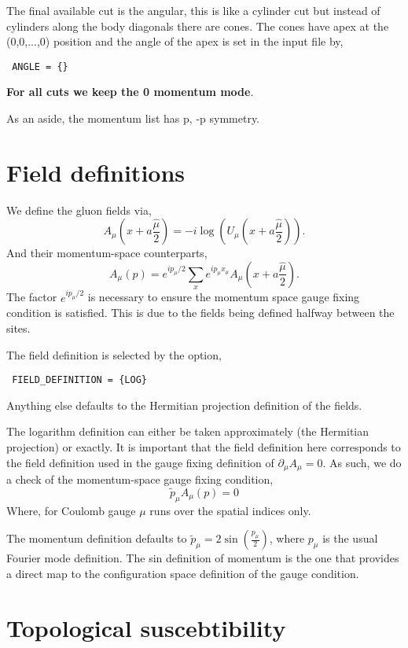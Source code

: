 \documentclass[12pt]{article}
\newcommand{\UMP}{\mbox{$U_\mu\left(x+a\frac{\hat\mu}{2}\right)$}}
\newcommand{\AMP}{\mbox{$A_\mu\left(x+a\frac{\hat\mu}{2}\right)$}}
\begin{document}
The final available cut is the angular, this is like a cylinder cut but instead of cylinders along the body diagonals there are cones. The cones have apex at the (0,0,...,0) position and the angle of the apex is set in the input file by,
\begin{verbatim}
 ANGLE = {}
\end{verbatim}

\textbf{For all cuts we keep the 0 momentum mode}. 

As an aside, the momentum list has p, -p symmetry.

\section{Field definitions}

We define the gluon fields via,
\begin{equation}
 \AMP = -i\log\left( \UMP \right).
\end{equation}
And their momentum-space counterparts,
\begin{equation}
 A_\mu(p) = e^{ip_\mu/2} \sum_{x} e^{ip_\mu x_\mu} \AMP.
\end{equation}
The factor $e^{ip_\mu/2}$ is necessary to ensure the momentum space gauge fixing condition is satisfied. This is due to the fields being defined halfway between the sites.

The field definition is selected by the option,
\begin{verbatim}
 FIELD_DEFINITION = {LOG}
\end{verbatim}
Anything else defaults to the Hermitian projection definition of the fields.

The logarithm definition can either be taken approximately (the Hermitian projection) or exactly. It is important that the field definition here corresponds to the field definition used in the gauge fixing definition of $\partial_\mu A_\mu=0$. As such, we do a check of the momentum-space gauge fixing condition,
\begin{equation}
 \tilde{p}_\mu A_\mu(p) = 0
\end{equation}
Where, for Coulomb gauge $\mu$ runs over the spatial indices only.

The momentum definition defaults to $\tilde{p}_\mu=2\sin\left(\frac{p_\mu}{2}\right)$, where $p_\mu$ is the usual Fourier mode definition. The sin definition of momentum is the one that provides a direct map to the configuration space definition of the gauge condition.

\section{Topological suscebtibility}
\end{document}
